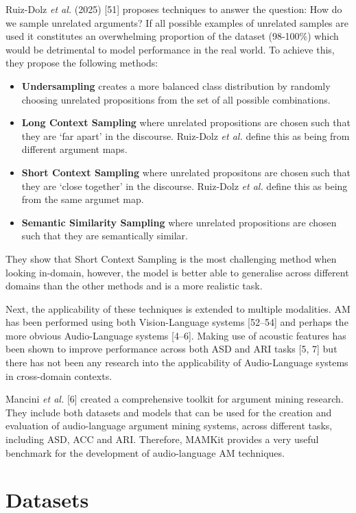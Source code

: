 \documentclass[twocolumn,twoside]{article}
\providecommand{\tightlist}{%
  \setlength{\itemsep}{0pt}\setlength{\parskip}{0pt}}
\begin{document}
Ruiz-Dolz \emph{et al.} (2025) {[}51{]} proposes techniques to answer
the question: How do we sample unrelated arguments? If all possible
examples of unrelated samples are used it constitutes an overwhelming
proportion of the dataset (98-100\%) which would be detrimental to model
performance in the real world. To achieve this, they propose the
following methods:

\begin{itemize}
\tightlist
\item
  \textbf{Undersampling} creates a more balanced class distribution by
  randomly choosing unrelated propositions from the set of all possible
  combinations.
\item
  \textbf{Long Context Sampling} where unrelated propositions are chosen
  such that they are `far apart' in the discourse. Ruiz-Dolz \emph{et
  al.} define this as being from different argument maps.
\item
  \textbf{Short Context Sampling} where unrelated propositons are chosen
  such that they are `close together' in the discourse. Ruiz-Dolz
  \emph{et al.} define this as being from the same argumet map.
\item
  \textbf{Semantic Similarity Sampling} where unrelated propositions are
  chosen such that they are semantically similar.
\end{itemize}

They show that Short Context Sampling is the most challenging method
when looking in-domain, however, the model is better able to generalise
across different domains than the other methods and is a more realistic
task.

Next, the applicability of these techniques is extended to multiple
modalities. AM has been performed using both Vision-Language systems
{[}52--54{]} and perhaps the more obvious Audio-Language systems
{[}4--6{]}. Making use of acoustic features has been shown to
improve performance across both ASD and ARI tasks {[}5, 7{]} but
there has not been any research into the applicability of Audio-Language
systems in cross-domain contexts.

Mancini \emph{et al.} {[}6{]} created a comprehensive toolkit for
argument mining research. They include both datasets and models that can
be used for the creation and evaluation of audio-language argument
mining systems, across different tasks, including ASD, ACC and ARI.
Therefore, MAMKit provides a very useful benchmark for the development
of audio-language AM techniques.

\section{Datasets}\label{sec:datasets}
\end{document}
